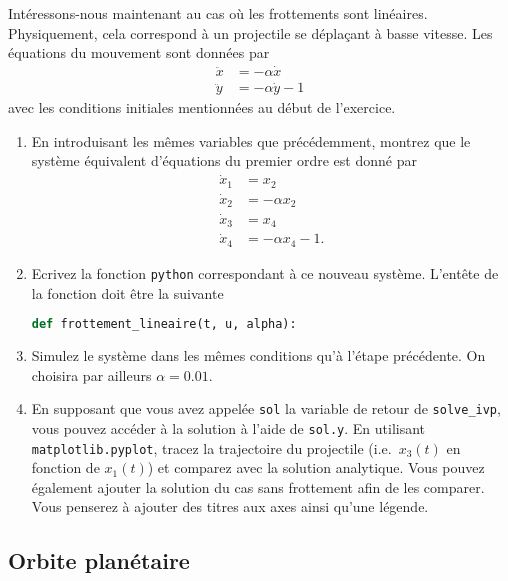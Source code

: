 \documentclass[a4paper,12pt]{article} %
\begin{document}
Intéressons-nous maintenant au cas où les frottements sont linéaires.
Physiquement, cela correspond à un projectile se déplaçant à basse vitesse.
Les équations du mouvement sont données par
%
\[
\begin{aligned}
  \ddot{x} & = -\alpha \dot{x} \\
  \ddot{y} & = -\alpha \dot{y} - 1
\end{aligned}
\]
%
avec les conditions initiales mentionnées au début de l'exercice.

\begin{enumerate}
\item En introduisant les mêmes variables que précédemment, montrez que le système équivalent d'équations du premier ordre est donné par
  \[
  \begin{aligned}
    \dot{x}_1 & = x_2 \\
    \dot{x}_2 & = -\alpha x_2 \\
    \dot{x}_3 & = x_4 \\
    \dot{x}_4 & = -\alpha x_4 - 1.
  \end{aligned}
  \]

\item Ecrivez la fonction \verb+python+ correspondant à ce nouveau système.
  L'entête de la fonction doit être la suivante
  \begin{lstlisting}[language=Python]
    def frottement_lineaire(t, u, alpha):
  \end{lstlisting}

\item Simulez le système dans les mêmes conditions qu'à l'étape précédente.
  On choisira par ailleurs $\alpha = 0.01$.

\item En supposant que vous avez appelée \verb+sol+ la variable de retour de \verb+solve_ivp+, vous pouvez accéder à la solution à l'aide de \verb+sol.y+.
  En utilisant \verb+matplotlib.pyplot+, tracez la trajectoire du projectile (i.e.\ $x_3(t)$ en fonction de $x_1(t)$) et comparez avec la solution analytique.
  Vous pouvez également ajouter la solution du cas sans frottement afin de les comparer.
  Vous penserez à ajouter des titres aux axes ainsi qu'une légende.
\end{enumerate}



\subsection*{Orbite planétaire}
\end{document}
